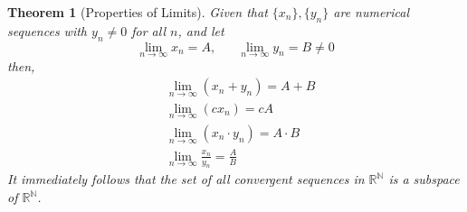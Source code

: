 \documentclass{article}
\newtheorem{theorem}{Theorem}[section]
\theoremstyle{remark}
\theoremstyle{definition}
\begin{document}
\begin{theorem}[Properties of Limits]
Given that $\{x_n\}, \{y_n\}$ are numerical sequences with $y_n \neq 0$ for all $n$, and let 
\[\lim_{n \rightarrow \infty} x_n = A, \;\;\;\;\;\; \lim_{n \rightarrow \infty} y_n = B \neq 0\]
then, 
\begin{align*}
    & \lim_{n\rightarrow \infty} (x_n + y_n) = A + B \\
    & \lim_{n \rightarrow \infty} (c x_n) = c A \\
    & \lim_{n \rightarrow \infty} (x_n \cdot y_n) = A \cdot B \\
    & \lim_{n \rightarrow \infty} \frac{x_n}{y_n} = \frac{A}{B}
\end{align*}
It immediately follows that the set of all convergent sequences in $\mathbb{R}^\mathbb{N}$ is a subspace of $\mathbb{R}^\mathbb{N}$. 
\end{theorem}
\end{document}
